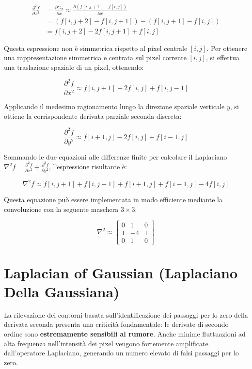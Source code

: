﻿\documentclass[11pt, a4paper]{article}
\begin{document}
\begin{align*}
\frac{\partial^2 f}{\partial x^2} &= \frac{\partial G_x}{\partial x} \approx \frac{\partial (f[i, j+1] - f[i, j])}{\partial x} \\
&= (f[i, j+2] - f[i, j+1]) - (f[i, j+1] - f[i, j]) \\
&= f[i, j+2] - 2f[i, j+1] + f[i, j]
\end{align*}

Questa espressione non è simmetrica rispetto al pixel centrale $[i, j]$. Per ottenere una rappresentazione simmetrica e centrata sul pixel corrente $[i,j]$, si effettua una traslazione spaziale di un pixel, ottenendo:

\[ \frac{\partial^2 f}{\partial x^2} \approx f[i, j+1] - 2f[i, j] + f[i, j-1] \]

Applicando il medesimo ragionamento lungo la direzione spaziale verticale $y$, si ottiene la corrispondente derivata parziale seconda discreta:

\[ \frac{\partial^2 f}{\partial y^2} \approx f[i+1, j] - 2f[i, j] + f[i-1, j] \]

Sommando le due equazioni alle differenze finite per calcolare il Laplaciano $\nabla^2 f = \frac{\partial^2 f}{\partial x^2} + \frac{\partial^2 f}{\partial y^2}$, l'espressione risultante è:

\[ \nabla^2 f \approx f[i, j+1] + f[i, j-1] + f[i+1, j] + f[i-1, j] - 4f[i, j] \]

Questa equazione può essere implementata in modo efficiente mediante la convoluzione con la seguente maschera $3 \times 3$:

\[ \nabla^2 \approx \begin{bmatrix} 0 & 1 & 0 \\ 1 & -4 & 1 \\ 0 & 1 & 0 \end{bmatrix} \]


\newpage

\section{Laplacian of Gaussian (Laplaciano Della Gaussiana)}

La rilevazione dei contorni basata sull'identificazione dei passaggi per lo zero della derivata seconda presenta una criticità fondamentale: le derivate di secondo ordine sono \textbf{estremamente sensibili al rumore}. Anche minime fluttuazioni ad alta frequenza nell'intensità dei pixel vengono fortemente amplificate dall'operatore Laplaciano, generando un numero elevato di falsi passaggi per lo zero.
\end{document}
